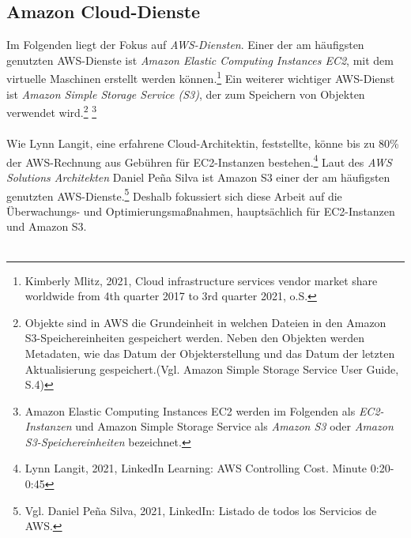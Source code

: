 \subsection{Amazon Cloud-Dienste}%
Im Folgenden liegt der Fokus auf \textit{AWS-Diensten}. Einer der am häufigsten genutzten AWS-Dienste ist \textit{Amazon Elastic Computing Instances EC2}, mit dem virtuelle Maschinen erstellt werden können.\footnote{Kimberly Mlitz, 2021, Cloud infrastructure services vendor market share worldwide from 4th quarter 2017 to 3rd quarter 2021, o.S.\cite{STA4}} Ein weiterer wichtiger AWS-Dienst ist \textit{Amazon Simple Storage Service (S3)}, der zum Speichern von Objekten verwendet wird.\footnote{Objekte sind in AWS die Grundeinheit in welchen Dateien in den Amazon S3-Speichereinheiten gespeichert werden. Neben den Objekten werden Metadaten, wie das Datum der Objekterstellung und das Datum der letzten Aktualisierung gespeichert.(Vgl. Amazon Simple Storage Service User Guide, S.4\cite{AMZ18})}{ }\footnote{Amazon Elastic Computing Instances EC2 werden im Folgenden als \textit{EC2-Instanzen} und Amazon Simple Storage Service als \textit{Amazon S3} oder \textit{Amazon S3-Speichereinheiten} bezeichnet.}
\\\\
Wie Lynn Langit, eine erfahrene Cloud-Architektin, feststellte, könne bis zu 80\% der AWS-Rechnung aus Gebühren für EC2-Instanzen bestehen.\footnote{Lynn Langit, 2021, LinkedIn Learning: AWS Controlling Cost. Minute 0:20-0:45\cite{LINK2}} Laut des \textit{AWS Solutions Architekten} Daniel Peña Silva ist Amazon S3 einer der am häufigsten genutzten AWS-Dienste.\footnote{Vgl. Daniel Peña Silva, 2021, LinkedIn: Listado de todos los Servicios de AWS.\cite{LINK1}} Deshalb fokussiert sich diese Arbeit auf die Überwachungs- und Optimierungsmaßnahmen, hauptsächlich für EC2-Instanzen und Amazon S3.  %
\\\\
